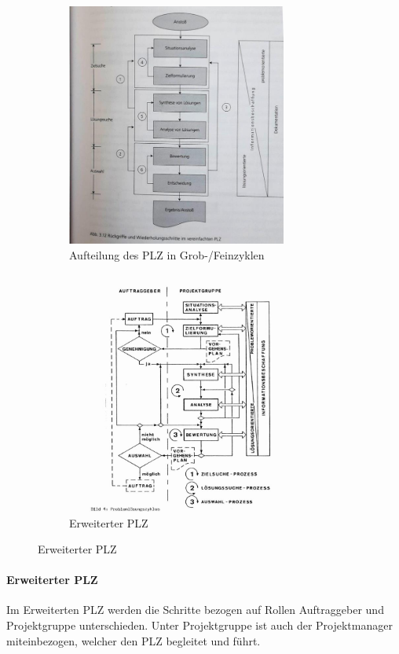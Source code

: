 \documentclass[a4paper]{article}
\begin{document}
\newpage
		
		\begin{figure}[!htb]
			\centering
			\begin{subfigure}{.45\textwidth}
				\centering
				\includegraphics[height=8cm]{img/pm/plz_teile.jpg}
				\caption{Aufteilung des PLZ in Grob-/Feinzyklen}
				\label{fig:plz_teile}
			\end{subfigure}
			\begin{subfigure}{.45\textwidth}
				\centering
				\includegraphics[height=8cm]{img/pm/plz_ext.jpg}
				\caption{Erweiterter PLZ}
				\label{fig:plz_ext}
			\end{subfigure}
		\end{figure}
		
		\paragraph{Erweiterter PLZ}
		
		Im Erweiterten PLZ werden die Schritte bezogen auf Rollen Auftraggeber und Projektgruppe unterschieden.
		Unter Projektgruppe ist auch der Projektmanager miteinbezogen, welcher den PLZ begleitet und führt.
	
\end{document}
